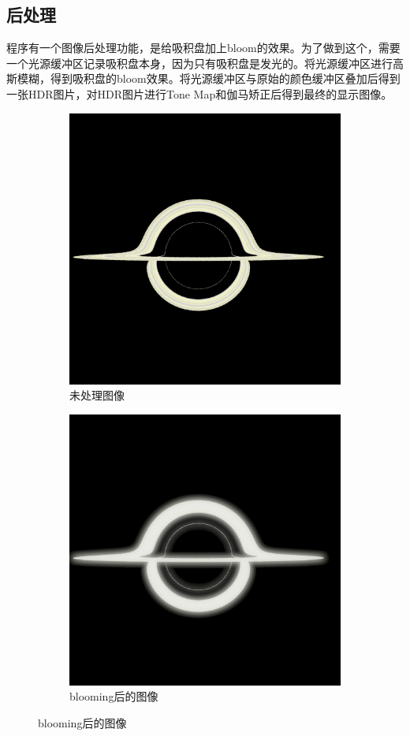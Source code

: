 \subsection{后处理}
程序有一个图像后处理功能，是给吸积盘加上bloom的效果。为了做到这个，需要一个光源缓冲区记录吸积盘本身，因为只有吸积盘是发光的。将光源缓冲区进行高斯模糊，得到吸积盘的bloom效果。将光源缓冲区与原始的颜色缓冲区叠加后得到一张HDR图片，对HDR图片进行Tone Map和伽马矫正后得到最终的显示图像。
\begin{figure}[H]
    \centering
    \begin{subfigure}{.5\textwidth}
        \centering
        \includegraphics[width=.8\linewidth]{images/no-bloom.png}
        \caption{未处理图像}
        \label{fig:no-bloom}
    \end{subfigure}%
    \begin{subfigure}{.5\textwidth}
        \centering
        \includegraphics[width=.8\linewidth]{images/bloom.png}
        \caption{blooming后的图像}
        \label{fig:bloomed}
    \end{subfigure}
\end{figure}


